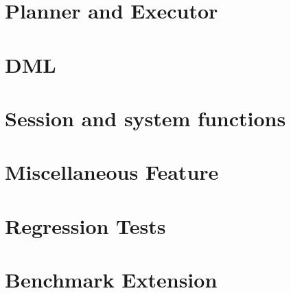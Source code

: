 \documentclass[10pt,a4paper]{book}
\begin{document}



\chapter{\label{chap:plannerExecutor}Planner and Executor}





\chapter{\label{chap:DML}DML}





\chapter{\label{chap:func}Session and system functions}





\chapter{\label{chap:misc}Miscellaneous Feature}





\chapter{\label{chap:regression}Regression Tests}





\chapter{\label{chap:benchmark}Benchmark Extension}
\end{document}
